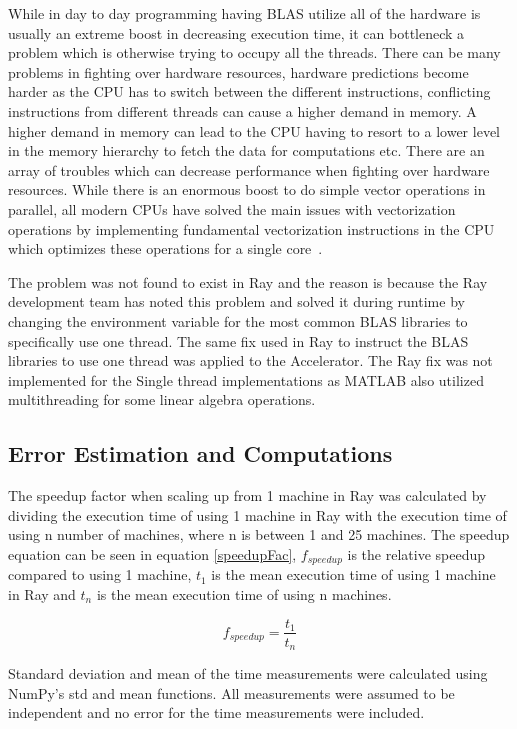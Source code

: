 \documentclass[12pt, a4paper]{article}
\begin{document}
While in day to day programming having BLAS utilize all of the hardware is usually an extreme boost in decreasing execution time, it can bottleneck a problem which is otherwise trying to occupy all the threads. 
There can be many problems in fighting over hardware resources, hardware predictions become harder as the CPU has to switch between the different instructions, conflicting instructions from different threads can cause a higher demand in memory.
A higher demand in memory can lead to the CPU having to resort to a lower level in the memory hierarchy to fetch the data for computations etc. 
There are an array of troubles which can decrease performance when fighting over hardware resources.
While there is an enormous boost to do simple vector operations in parallel, all modern CPUs have solved the main issues with vectorization operations by implementing fundamental vectorization instructions in the CPU which optimizes these operations for a single core~\cite{enwiki:avx}.

The problem was not found to exist in Ray and the reason is because the Ray development team has noted this problem and solved it during runtime by changing the environment variable for the most common BLAS libraries to specifically use one thread. 
The same fix used in Ray to instruct the BLAS libraries to use one thread was applied to the Accelerator.
The Ray fix was not implemented for the Single thread implementations as MATLAB also utilized multithreading for some linear algebra operations. 

\subsection{Error Estimation and Computations}

The speedup factor when scaling up from 1 machine in Ray was calculated by dividing the execution time of using 1 machine in Ray with the execution time of using n number of machines, where n is between 1 and 25 machines.
The speedup equation can be seen in equation \eqref{speedupFac}, $f_{speedup}$ is the relative speedup compared to using 1 machine, $t_1$ is the mean execution time of using 1 machine in Ray and $t_n$ is the mean execution time of using n machines.

\begin{equation}\label{speedupFac}
    f_{speedup} = \frac{t_1}{t_n}
\end{equation}

Standard deviation and mean of the time measurements were calculated using NumPy's std and mean functions.
All measurements were assumed to be independent and no error for the time measurements were included.
\end{document}
